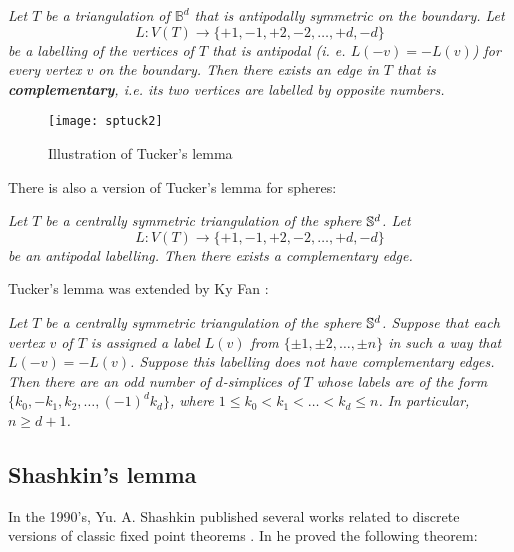 \documentclass[a4paper,12pt]{article}
\begin{document}
\medskip

 {\it Let $T$ be a triangulation of  ${\mathbb B}^d$ that is antipodally symmetric on the boundary. Let $$L:V(T)\to \{+1,-1,+2,-2,\ldots, +d,-d\}$$ be a  labelling of the vertices of $T$ that is antipodal (i. e. $L(-v)=-L(v)$)  for every vertex $v$ on the boundary. Then there exists an edge in $T$ that is {\bf complementary}, i.e. its two vertices are labelled by opposite numbers.}

\medskip

\begin{figure}
\begin{center}


  \texttt{[image: sptuck2]}
\end{center}
\caption{Illustration of Tucker's lemma}
\end{figure}


\medskip

There is also a version of Tucker's lemma for spheres:

\medskip

  {\it Let $T$ be a centrally symmetric triangulation of the sphere ${\Bbb S}^d$. Let $$L:V(T)\to \{+1,-1,+2,-2,\ldots, +d,-d\}$$ be an antipodal labelling. Then there exists a complementary edge.}

\medskip

Tucker's lemma was extended by Ky Fan \cite{KyFan}:

\medskip

  {\it Let $T$ be a centrally symmetric triangulation of the sphere ${\Bbb S}^d$. Suppose that each vertex $v$ of $T$ is assigned a label $L(v)$ from $\{\pm1,\pm2,\ldots,\pm n\}$ in such a way that $L(-v)=-L(v)$. Suppose this labelling does not have complementary edges. Then there are an odd number of $d$-simplices of $T$ whose labels are of the form $\{k_0,-k_1,k_2,\ldots,(-1)^dk_d\}$, where $1\le k_0<k_1<\ldots<k_d\le n$. In particular, $n\ge d+1$.}




\subsection{Shashkin's lemma}
In the 1990's, Yu. A. Shashkin published several works related to discrete versions of classic fixed point theorems  \cite{Shashkin, Shashkin1, Shashkin2, ShashkinT, Shashkin99}. In  \cite{ShashkinT} he proved the following theorem:
\end{document}
